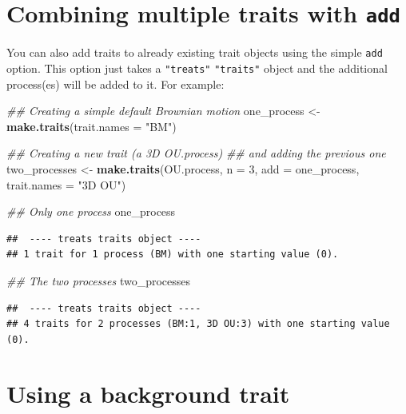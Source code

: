 \documentclass[
]{book}
\newenvironment{Shaded}{\begin{snugshade}}{\end{snugshade}}
\newcommand{\CommentTok}[1]{\textcolor[rgb]{0.56,0.35,0.01}{\textit{#1}}}
\newcommand{\DataTypeTok}[1]{\textcolor[rgb]{0.13,0.29,0.53}{#1}}
\newcommand{\DecValTok}[1]{\textcolor[rgb]{0.00,0.00,0.81}{#1}}
\newcommand{\KeywordTok}[1]{\textcolor[rgb]{0.13,0.29,0.53}{\textbf{#1}}}
\newcommand{\NormalTok}[1]{#1}
\newcommand{\StringTok}[1]{\textcolor[rgb]{0.31,0.60,0.02}{#1}}
\begin{document}
\hypertarget{combining-multiple-traits-with-add}{%
\section{\texorpdfstring{Combining multiple traits with \texttt{add}}{Combining multiple traits with add}}\label{combining-multiple-traits-with-add}}

You can also add traits to already existing trait objects using the simple \texttt{add} option.
This option just takes a \texttt{"treats"} \texttt{"traits"} object and the additional process(es) will be added to it.
For example:

\begin{Shaded}
\begin{Highlighting}[]
\CommentTok{\#\# Creating a simple default Brownian motion}
\NormalTok{one\_process \textless{}{-}}\StringTok{ }\KeywordTok{make.traits}\NormalTok{(}\DataTypeTok{trait.names =} \StringTok{"BM"}\NormalTok{)}

\CommentTok{\#\# Creating a new trait (a 3D OU.process)}
\CommentTok{\#\# and adding the previous one}
\NormalTok{two\_processes \textless{}{-}}\StringTok{ }\KeywordTok{make.traits}\NormalTok{(OU.process, }\DataTypeTok{n =} \DecValTok{3}\NormalTok{, }\DataTypeTok{add =}\NormalTok{ one\_process,}
                             \DataTypeTok{trait.names =} \StringTok{"3D OU"}\NormalTok{)}

\CommentTok{\#\# Only one process}
\NormalTok{one\_process}
\end{Highlighting}
\end{Shaded}

\begin{verbatim}
##  ---- treats traits object ---- 
## 1 trait for 1 process (BM) with one starting value (0).
\end{verbatim}

\begin{Shaded}
\begin{Highlighting}[]
\CommentTok{\#\# The two processes}
\NormalTok{two\_processes}
\end{Highlighting}
\end{Shaded}

\begin{verbatim}
##  ---- treats traits object ---- 
## 4 traits for 2 processes (BM:1, 3D OU:3) with one starting value (0).
\end{verbatim}

\hypertarget{using-a-background-trait}{%
\section{Using a background trait}\label{using-a-background-trait}}
\end{document}
